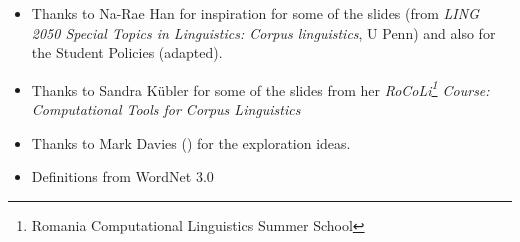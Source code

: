 \documentclass[a4paper,landscape,headrule,footrule,xetex]{foils}
\begin{document}


\begin{itemize}
\item Thanks to Na-Rae Han for 
  inspiration for some of the slides (from  \textit{LING 2050 Special Topics in Linguistics: Corpus linguistics}, U Penn) and also for the Student Policies (adapted).
\item Thanks to Sandra K\"{u}bler for some of the slides from her 
\textit{RoCoLi\footnote{Romania Computational Linguistics Summer School} Course: Computational Tools for Corpus Linguistics}
\item Thanks to Mark Davies (\engcor) for the exploration ideas.
\item Definitions from WordNet 3.0
\end{itemize}


\small


\end{document}
